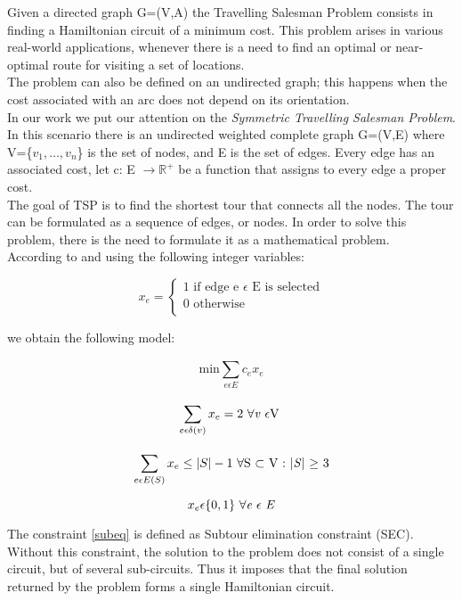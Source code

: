 Given a directed graph G=(V,A) the Travelling Salesman Problem consists in finding a Hamiltonian circuit of a minimum cost. This problem arises in various real-world applications, whenever there is a need to find an optimal or near-optimal route for visiting a set of locations.\\
The problem can also be defined on an undirected graph; this happens when the cost associated with an arc does not depend on its orientation.\\ 
In our work we put our attention on the \textit{Symmetric Travelling Salesman Problem}. In this scenario there is an undirected weighted complete graph G=(V,E) where V=\{$v_1,\dotsc,v_n$\} is the set of nodes, and E is the set of edges. Every edge has an associated cost, let c: E $\rightarrow \mathbb{R}^+$ be a function that assigns to every edge a proper cost.\\
The goal of TSP is to find the shortest tour that connects all the nodes. The tour can be formulated as a sequence of edges, or nodes. In order to solve this problem, there is the need to formulate it as a mathematical problem.
\\According to  \cite{fischetti2019introduction} and using the following integer variables:



\begin{equation*}
    x_e=
        \begin{cases}
            \text{1 if edge e $\epsilon$ E is selected}\\
        0 \text{ otherwise}\\
          \end{cases}
\end{equation*}

we obtain the following model:

\begin{equation}
    \text{min}\sum_{e \epsilon E}^{}c_ex_e
\end{equation}

\begin{equation}
    \sum_{e \epsilon \delta (v)}^{}x_e=2 \text{ $\forall$\textit{v} $\epsilon$V } 
\end{equation}

\begin{equation} \label{subeq}
    \sum_{e\epsilon E(S)}^{}x_e \leq |S|-1 \text{ $\forall$S $\subset$ V : |\textit{S}| $\geq$ 3}
\end{equation}

\begin{equation}
    x_e \epsilon \{0,1\} \text{ $\forall$\textit{e} $\epsilon$ \textit{E}}
\end{equation}


The constraint \ref{subeq} is defined as Subtour elimination constraint (SEC). Without this constraint, the solution to the problem does not consist of a single circuit, but of several sub-circuits. Thus it imposes that the final solution returned by the problem forms a single Hamiltonian circuit.